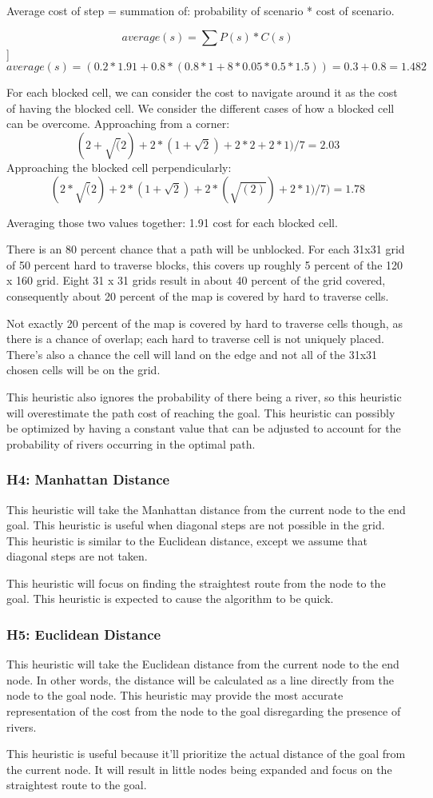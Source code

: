 Average cost of step = summation of: probability of scenario * cost of scenario.

\[average(s) = \sum{P(s)*C(s)}  \]]
\[average(s) = (0.2 * 1.91 + 0.8 * ( 0.8 * 1 + 8*0.05*0.5*1.5 ) ) = 0.3 + 0.8 = 1.482\]

For each blocked cell, we can consider the cost to navigate around it as the cost of having the blocked cell. We consider the different cases of how a blocked cell can be overcome. 
Approaching from a corner: \[(2 + \sqrt(2) + 2 * ( 1 + \sqrt{2}) + 2 * 2 + 2 * 1) / 7  = 2.03\]
Approaching the blocked cell perpendicularly: \[ (2*\sqrt(2) + 2*(1 + \sqrt{2}) + 2 * (\sqrt{(2)}) + 2*1 )/ 7 ) = 1.78 \]

Averaging those two values together: 1.91 cost for each blocked cell.

There is an 80 percent chance that a path will be unblocked.
For each 31x31 grid of 50 percent hard to traverse blocks, this covers up roughly 5 percent of the 120 x 160 grid. Eight 31 x 31 grids result in about 40 percent of the grid covered, consequently about 20 percent of the map is covered by hard to traverse cells.

Not exactly 20 percent of the map is covered by hard to traverse cells though, as there is a chance of overlap; each hard to traverse cell is not uniquely placed. There's also a chance the cell will land on the edge and not all of the 31x31 chosen cells will be on the grid.

This heuristic also ignores the probability of there being a river, so this heuristic will overestimate the path cost of reaching the goal. This heuristic can possibly be optimized by having a constant value that can be adjusted to account for the probability of rivers occurring in the optimal path.

\subsubsection{H4: Manhattan Distance}
This heuristic will take the Manhattan distance from the current node to the end goal. This heuristic is useful when diagonal steps are not possible in the grid. This heuristic is similar to the Euclidean distance, except we assume that diagonal steps are not taken.

This heuristic will focus on finding the straightest route from the node to the goal. This heuristic is expected to cause the algorithm to be quick.

\subsubsection{H5: Euclidean Distance}
This heuristic will take the Euclidean distance from the current node to the end node. In other words, the distance will be calculated as a line directly from the node to the goal node. This heuristic may provide the most accurate representation of the cost from the node to the goal disregarding the presence of rivers.

This heuristic is useful because it'll prioritize the actual distance of the goal from the current node. It will result in little nodes being expanded and focus on the straightest route to the goal.
